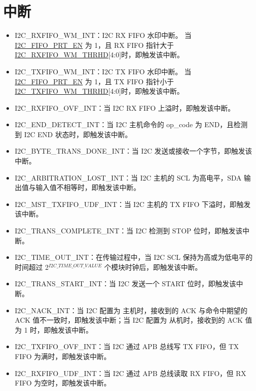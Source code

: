 \documentclass[main\_\_CN.tex]{subfiles}
\begin{document}
\section{中断}\label{sub:i2c-int}
\begin{itemize}
    \item \label{int:i2c-rxfifo-wm}I2C\_RXFIFO\_WM\_INT：I2C RX FIFO 水印中断。 当\hyperref[fielddesc:I2CFIFOPRTEN]{I2C\_FIFO\_PRT\_EN} 为 1，且 RX FIFO 指针大于 \hyperref[fielddesc:I2CRXFIFOWMTHRHD]{I2C\_RXFIFO\_WM\_THRHD}[4:0]时，即触发该中断。
    \item \label{int:i2c-txfifo-wm}I2C\_TXFIFO\_WM\_INT：I2C TX FIFO 水印中断。 当\hyperref[fielddesc:I2CFIFOPRTEN]{I2C\_FIFO\_PRT\_EN} 为 1，且 TX FIFO 指针小于 \hyperref[fielddesc:I2CTXFIFOWMTHRHD]{I2C\_TXFIFO\_WM\_THRHD}[4:0]时，即触发该中断。
    \item \label{int:i2c-rxfifo-ovf}I2C\_RXFIFO\_OVF\_INT：当 I2C RX FIFO 上溢时，即触发该中断。
    \item \label{int:i2c-end}I2C\_END\_DETECT\_INT：当 I2C 主机命令的 op\_code 为 END，且检测到 I2C END 状态时，即触发该中断。
    \item \label{int:i2c-byte-trans-done}I2C\_BYTE\_TRANS\_DONE\_INT：当 I2C 发送或接收一个字节，即触发该中断。
    \item \label{int:i2c-arbitration-lost}I2C\_ARBITRATION\_LOST\_INT：当 I2C 主机的 SCL 为高电平，SDA 输出值与输入值不相等时，即触发该中断。
    \item \label{int:i2c-mst-txfifo-udf}I2C\_MST\_TXFIFO\_UDF\_INT：当 I2C 主机的 TX FIFO 下溢时，即触发该中断。
    \item \label{int:i2c-trans-complete}I2C\_TRANS\_COMPLETE\_INT：当 I2C 检测到 STOP 位时，即触发该中断。
    \item \label{int:i2c-time-out}I2C\_TIME\_OUT\_INT：在传输过程中，当 I2C SCL 保持为高或为低电平的时间超过 2$^{\hyperref[fielddesc:I2CTIMEOUTVALUE]{I2C\_TIME\_OUT\_VALUE}}$ 个模块时钟后，即触发该中断。
    \item \label{int:i2c-trans-start}I2C\_TRANS\_START\_INT：当 I2C 发送一个 START 位时，即触发该中断。
    \item \label{int:i2c-nack}I2C\_NACK\_INT：当 I2C 配置为 主机时，接收到的 ACK 与命令中期望的 ACK 值不一致时，即触发该中断；当 I2C 配置为 从机时，接收到的 ACK 值为 1 时，即触发该中断。
    \item \label{int:i2c-txfifo-ovf}I2C\_TXFIFO\_OVF\_INT：当 I2C 通过 APB 总线写 TX FIFO，但 TX FIFO 为满时，即触发该中断。
    \item \label{int:i2c-rxfifo-udf}I2C\_RXFIFO\_UDF\_INT：当 I2C 通过 APB 总线读取 RX FIFO，但 RX FIFO 为空时，即触发该中断。

\end{itemize}
\end{document}
